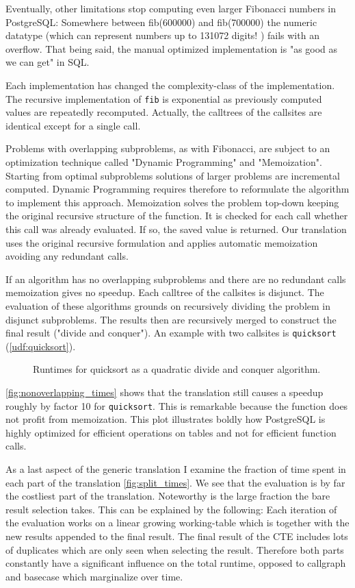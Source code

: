 Eventually, other limitations stop computing even larger Fibonacci numbers in PostgreSQL: Somewhere between fib(600000) and fib(700000) the numeric datatype (which can represent numbers up to 131072 digits! \cite[p. 124 f.]{psql}) fails with an overflow. That being said, the manual optimized implementation is "as good as we can get" in SQL.

Each implementation has changed the complexity-class of the implementation. The recursive implementation of \texttt{fib} is exponential \cite{} as previously computed values are repeatedly recomputed. Actually, the calltrees of the callsites are identical except for a single call.

Problems with overlapping subproblems, as with Fibonacci, are subject to an optimization technique called "Dynamic Programming" and "Memoization". Starting from optimal subproblems solutions of larger problems are incremental computed. Dynamic Programming requires therefore to reformulate the algorithm to implement this approach. Memoization solves the problem top-down keeping the original recursive structure of the function. It is checked for each call whether this call was already evaluated. If so, the saved value is returned. Our translation uses the original recursive formulation and applies automatic memoization avoiding any redundant calls.

If an algorithm has no overlapping subproblems and there are no redundant calls memoization gives no speedup. Each calltree of the callsites is disjunct. The evaluation of these algorithms grounds on recursively dividing the problem in disjunct subproblems. The results then are recursively merged to construct the final result ("divide and conquer"). An example with two callsites is \texttt{quicksort} (\autoref{udf:quicksort}).

\begin{figure}[h!]
    \centering\small
    
    \caption{Runtimes for quicksort as a quadratic divide and conquer algorithm.}
    \label{fig:nonoverlapping_times}
\end{figure}

\autoref{fig:nonoverlapping_times} shows that the translation still causes a speedup roughly by factor 10 for \texttt{quicksort}. This is remarkable because the function does not profit from memoization. This plot illustrates boldly how PostgreSQL is highly optimized for efficient operations on tables and not for efficient function calls.

As a last aspect of the generic translation I examine the fraction of time spent in each part of the translation \autoref{fig:split_times}. We see that the evaluation is by far the costliest part of the translation. Noteworthy is the large fraction the bare result selection takes. This can be explained by the following: Each iteration of the evaluation works on a linear growing working-table which is together with the new results appended to the final result. The final result of the CTE includes lots of duplicates which are only seen when selecting the result. Therefore both parts constantly have a significant influence on the total runtime, opposed to callgraph and basecase which marginalize over time.

